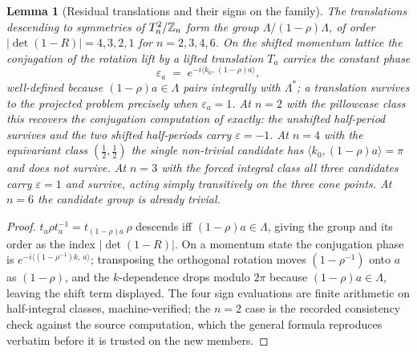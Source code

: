 \documentclass[11pt]{article}
\numberwithin{equation}{section}
\theoremstyle{plain}
\newtheorem{lemma}[theorem]{Lemma}
\theoremstyle{definition}
\theoremstyle{remark}
\newcommand{\Zn}[1][n]{\mathbb{Z}_{#1}}
\begin{document}
\begin{lemma}[Residual translations and their signs on the
family]\label{o4:residual-n}
The translations descending to symmetries of $\Ttwo_{n}/\Zn$ form
the group $\Lambda/(1 - \rho)\Lambda$, of order
$|\det(1 - R)| = 4, 3, 2, 1$ for $n = 2, 3, 4, 6$. On the shifted
momentum lattice the conjugation of the rotation lift by a lifted
translation $T_{a}$ carries the constant phase
\[
\varepsilon_{a} \;=\;
e^{-i\langle k_{0},\, (1 - \rho)a\rangle},
\]
well-defined because $(1 - \rho)a \in \Lambda$ pairs integrally
with $\Lambda^{*}$; a translation survives to the projected problem
precisely when $\varepsilon_{a} = 1$. At $n = 2$ with the
pillowcase class this recovers the conjugation computation of
\cite{MEF3} exactly: the unshifted half-period survives and the two
shifted half-periods carry $\varepsilon = -1$. At $n = 4$ with the
equivariant class $(\tfrac{1}{2}, \tfrac{1}{2})$ the single
non-trivial candidate has
$\langle k_{0}, (1 - \rho)a\rangle = \pi$ and does not survive. At
$n = 3$ with the forced integral class all three candidates carry
$\varepsilon = 1$ and survive, acting simply transitively on the
three cone points. At $n = 6$ the candidate group is already
trivial.
\end{lemma}

\begin{proof}
$t_{a}\rho t_{a}^{-1} = t_{(1-\rho)a}\,\rho$ descends iff
$(1 - \rho)a \in \Lambda$, giving the group and its order as the
index $|\det(1 - R)|$. On a momentum state the conjugation phase is
$e^{-i\langle(1 - \rho^{-1})k,\, a\rangle}$; transposing the
orthogonal rotation moves $(1 - \rho^{-1})$ onto $a$ as
$(1 - \rho)$, and the $k$-dependence drops modulo $2\pi$ because
$(1 - \rho)a \in \Lambda$, leaving the shift term displayed. The
four sign evaluations are finite arithmetic on half-integral
classes, machine-verified; the $n = 2$ case is the recorded
consistency check against the source computation, which the general
formula reproduces verbatim before it is trusted on the new
members.
\end{proof}
\end{document}
